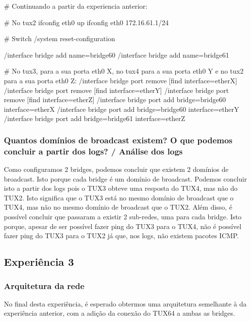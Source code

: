 \documentclass[11pt,a4paper,twocolumn]{article}
\begin{document}
\begin{bash-darktheme}
    # Continuando a partir da experiencia anterior:

    # No tux2
    ifconfig eth0 up
    ifconfig eth0 172.16.61.1/24

    # Switch
    /system reset-configuration

    /interface bridge add name=bridge60
    /interface bridge add name=bridge61

    # No tux3, para a sua porta eth0 X, no tux4 para a sua porta eth0 Y e no tux2 para a sua porta eth0 Z:
    /interface bridge port remove [find interface=etherX]
    /interface bridge port remove [find interface=etherY]
    /interface bridge port remove [find interface=etherZ]
    /interface bridge port add bridge=bridge60 interface=etherX
    /interface bridge port add bridge=bridge60 interface=etherY
    /interface bridge port add bridge=bridge61 interface=etherZ
\end{bash-darktheme}

\subsubsection{ Quantos domínios de broadcast existem? O que podemos concluir a partir dos logs? / Análise dos logs}

Como configuramos 2 bridges, podemos concluir que existem 2 domínios de broadcast. Isto porque cada bridge é um domínio de broadcast. Podemos concluir isto a partir dos logs pois o TUX3 obteve uma resposta do TUX4, mas não do TUX2. Isto significa que o TUX3 está no mesmo domínio de broadcast que o TUX4, mas não no mesmo domínio de broadcast que o TUX2.
Além disso, é possível concluir que passaram a existir 2 sub-redes, uma para cada bridge. Isto porque, apesar de ser possível fazer ping do TUX3 para o TUX4, não é possível fazer ping do TUX3 para o TUX2 já que, nos logs, não existem pacotes ICMP.

\subsection{Experiência 3}

\subsubsection{Arquitetura da rede}

No final desta experiência, é esperado obtermos uma arquitetura semelhante à da experiência anterior, com a adição da conexão do TUX64 a ambas as bridges.
\end{document}
